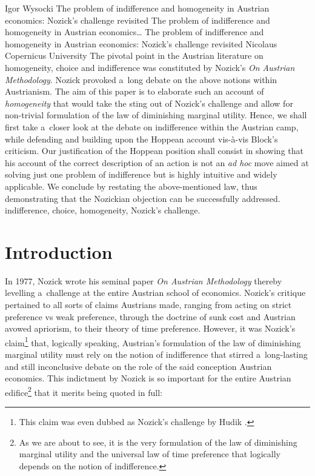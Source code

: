\begin{artengenv}{Igor Wysocki}
	{The problem of indifference and homogeneity in Austrian economics: Nozick's challenge revisited}
	{The problem of indifference and homogeneity in Austrian economics\ldots}
	{The problem of indifference and homogeneity in Austrian economics: Nozick's challenge revisited}
	{Nicolaus Copernicus University}
	{The pivotal point in the Austrian literature on homogeneity, choice and indifference was constituted by Nozick's \textit{On Austrian Methodology}. Nozick provoked a~long debate on the above notions within Austrianism. The aim of this paper is to elaborate such an account of \textit{homogeneity} that would take the sting out of Nozick's challenge and allow for non-trivial formulation of the law of diminishing marginal utility. Hence, we shall first take a~closer look at the debate on indifference within the Austrian camp, while defending and building upon the Hoppean account vis-à-vis Block's criticism. Our justification of the Hoppean position shall consist in showing that his account of the correct description of an action is not an \textit{ad hoc} move aimed at solving just one problem of indifference but is highly intuitive and widely applicable. We conclude by restating the above-mentioned law, thus demonstrating that the Nozickian objection can be successfully addressed.}
	{indifference, choice, homogeneity, Nozick's challenge.}



\section{Introduction }
\lettrine[loversize=0.13,lines=2,lraise=-0.01,nindent=0em,findent=0.2pt]%
{I}{}n 1977, Nozick wrote his seminal paper \textit{On Austrian Methodology}
\parencite[][]{nozick_austrian_1977} %
 thereby levelling a~challenge at the entire Austrian school of economics. Nozick's critique pertained to all sorts of claims Austrians made, ranging from acting on strict preference vs weak preference, through the doctrine of sunk cost and Austrian avowed apriorism, to their theory of time preference. However, it was Nozick's claim\footnote{This claim was even dubbed as Nozick's challenge by Hudik 
\parencite*[][]{hudik_note_2011}.%
} that, logically speaking, Austrian's formulation of the law of diminishing marginal utility must rely on the notion of indifference that stirred a~long-lasting and still inconclusive debate on the role of the said conception Austrian economics. This indictment by Nozick 
\parencite*[][pp.370–371]{nozick_austrian_1977} %
 is so important for the entire Austrian edifice\footnote{As we are about to see, it is the very formulation of the law of diminishing marginal utility and the universal law of time preference that logically depends on the notion of indifference.} that it merits being quoted in full:


\end{artengenv}
